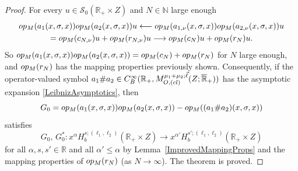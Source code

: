 \documentclass[10pt,a4paper]{amsart}
\def\N{\mathbb N}
\def\R{\mathbb R}
\def\S{\mathscr S}
\def\opm{\textup{op}_{\textit{M}}}
\begin{document}
\begin{proof}
For every $u \in \S_0(\R_+\times Z)$ and $N \in \N$ large enough
\begin{gather*}
\opm(a_1(x,\sigma,x))\opm(a_2(x,\sigma,x))u \longleftarrow \opm(a_{1,\nu}(x,\sigma,x))\opm(a_{2,\nu}(x,\sigma,x))u \\
= \opm(c_{N,\nu})u + \opm(r_{N,\nu})u \longrightarrow \opm(c_N)u + \opm(r_N)u.
\end{gather*}
So $\opm(a_1(x,\sigma,x))\opm(a_2(x,\sigma,x)) = \opm(c_N) + \opm(r_N)$ for $N$ large enough, and $\opm(r_N)$ has the mapping properties previously shown. Consequently, if the operator-valued symbol $a_1{\#}a_2 \in C^{\infty}_B(\R_+,M^{\mu_1+\mu_2;\vec{\ell}}_{O,\textup{(cl)}}(Z;\overline{\R}_+))$ has the asymptotic expansion \eqref{LeibnizAsymptotics}, then
$$
G_0 = \opm(a_1(x,\sigma,x))\opm(a_2(x,\sigma,x)) - \opm((a_1{\#}a_2)(x,\sigma,x))
$$
satisfies
$$
G_0,\,G_0^* : x^{\alpha}H^{s;(\ell_1,\ell_2)}_b(\R_+\times Z) \to x^{\alpha'}H^{s';(\ell_1,\ell_2)}_b(\R_+\times Z)
$$
for all $\alpha,s,s' \in \R$ and all $\alpha' \leq \alpha$ by Lemma~\ref{ImprovedMappingProps} and the mapping properties of $\opm(r_N)$ (as $N \to \infty$). The theorem is proved.
\end{proof}
\end{document}
